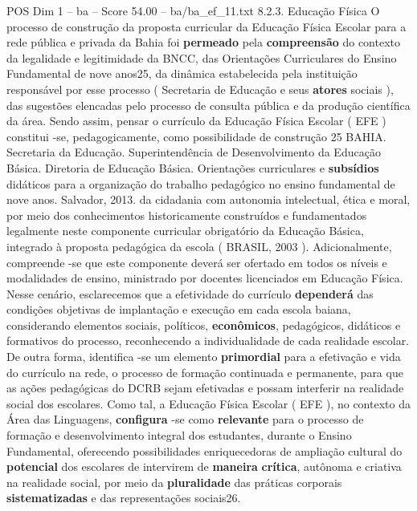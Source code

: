 \begin{textsample}{POS Dim 1 – ba – Score 54.00 – ba/ba\_ef\_11.txt}  \label{ex:f1_pos_106}
8.2.3.
Educação Física O processo de construção da proposta curricular da Educação Física Escolar para a rede pública e privada da Bahia foi \textbf{permeado} pela \textbf{compreensão} do contexto da legalidade e legitimidade da BNCC, das Orientações Curriculares do Ensino Fundamental de nove anos25, da dinâmica estabelecida pela instituição responsável por esse processo ( Secretaria de Educação e seus \textbf{atores} sociais ), das sugestões elencadas pelo processo de consulta pública e da produção científica da área.
Sendo assim, pensar o currículo da Educação Física Escolar ( EFE ) constitui -se, pedagogicamente, como possibilidade de construção 25 BAHIA.
Secretaria da Educação.
Superintendência de Desenvolvimento da Educação Básica.
Diretoria de Educação Básica.
Orientações curriculares e \textbf{subsídios} didáticos para a organização do trabalho pedagógico no ensino fundamental de nove anos.
Salvador, 2013. da cidadania com autonomia intelectual, ética e moral, por meio dos conhecimentos historicamente construídos e fundamentados legalmente neste componente curricular obrigatório da Educação Básica, integrado à proposta pedagógica da escola ( BRASIL, 2003 ).
Adicionalmente, compreende -se que este componente deverá ser ofertado em todos os níveis e modalidades de ensino, ministrado por docentes licenciados em Educação Física.
Nesse cenário, esclarecemos que a efetividade do currículo \textbf{dependerá} das condições objetivas de implantação e execução em cada escola baiana, considerando elementos sociais, políticos, \textbf{econômicos}, pedagógicos, didáticos e formativos do processo, reconhecendo a individualidade de cada realidade escolar.
De outra forma, identifica -se um elemento \textbf{primordial} para a efetivação e vida do currículo na rede, o processo de formação continuada e permanente, para que as ações pedagógicas do DCRB sejam efetivadas e possam interferir na realidade social dos escolares.
Como tal, a Educação Física Escolar ( EFE ), no contexto da Área das Linguagens, \textbf{configura} -se como \textbf{relevante} para o processo de formação e desenvolvimento integral dos estudantes, durante o Ensino Fundamental, oferecendo possibilidades enriquecedoras de ampliação cultural do \textbf{potencial} dos escolares de intervirem de \textbf{maneira} \textbf{crítica}, autônoma e criativa na realidade social, por meio da \textbf{pluralidade} das práticas corporais \textbf{sistematizadas} e das representações sociais26.

\end{textsample}
